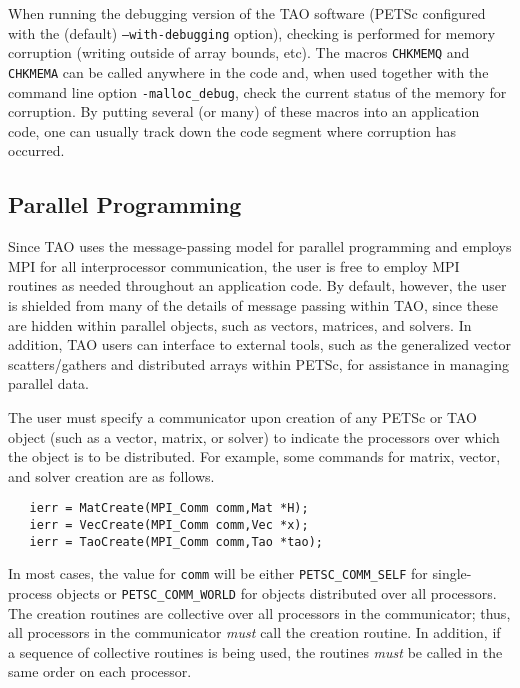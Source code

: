 When running the debugging version of the TAO software (PETSc configured 
with the (default) \texttt{--with-debugging} option), checking is performed for 
memory corruption
(writing outside of array bounds, etc). The macros \texttt{CHKMEMQ} and
\texttt{CHKMEMA} can be called anywhere in the code and, when used together 
with the command line option \texttt{-malloc\_debug}, check the current
status of the memory for corruption.  By putting several (or many) of
these macros into an application code, one can usually track
down the code segment where corruption has occurred.

\subsection*{Parallel Programming}

Since TAO uses the message-passing model for parallel programming and
employs MPI for all interprocessor communication, the user is free to
employ MPI routines as needed throughout an application code.
By default, however, the user is shielded from many of the details of
message passing within TAO, since these are hidden within parallel
objects, such as vectors, matrices, and solvers.  In addition, TAO
users can interface to external tools, such as the generalized vector
scatters/gathers and distributed arrays within PETSc, for assistance in
managing parallel data.

The user must specify a communicator
upon creation of any PETSc or TAO object (such as a vector, matrix, or 
solver)
to indicate the processors over which the object is to be distributed. 
For example, some commands for matrix, vector, and solver creation
are as follows.
\begin{verbatim}
   ierr = MatCreate(MPI_Comm comm,Mat *H);
   ierr = VecCreate(MPI_Comm comm,Vec *x);
   ierr = TaoCreate(MPI_Comm comm,Tao *tao); 
\end{verbatim}
\noindent
In most cases, the value for \texttt{comm} will be either 
\texttt{PETSC\_COMM\_SELF} for single-process objects or 
\texttt{PETSC\_COMM\_WORLD} for objects distributed over all processors.
The creation routines are collective over all processors in the
communicator; thus, all processors in the communicator {\em must} call
the creation routine.  In addition, if a sequence of collective
routines is being used, the routines {\em must} be called in the same
order on each processor.

